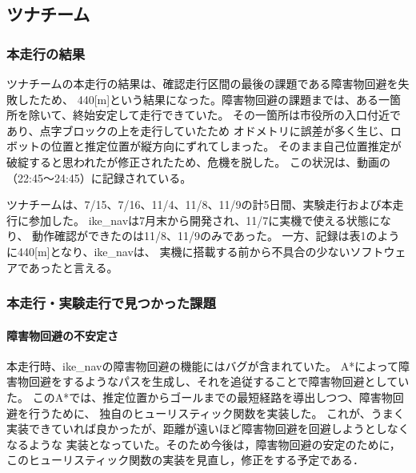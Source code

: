 \documentclass[twocolumn,9pt]{jsproceedings}
\begin{document}


\subsection{ツナチーム}
\subsubsection{本走行の結果}
ツナチームの本走行の結果は、確認走行区間の最後の課題である障害物回避を失敗したため、
440[m]という結果になった。障害物回避の課題までは、ある一箇所を除いて、終始安定して走行できていた。
その一箇所は市役所の入口付近であり、点字ブロックの上を走行していたため
オドメトリに誤差が多く生じ、ロボットの位置と推定位置が縦方向にずれてしまった。
そのまま自己位置推定が破綻すると思われたが修正されたため、危機を脱した。
この状況は、動画\cite{ike_nav_loc_youtube}の（22:45〜24:45）に記録されている。

ツナチームは、7/15、7/16、11/4、11/8、11/9の計5日間、実験走行および本走行に参加した。
ike\_navは7月末から開発され、11/7に実機で使える状態になり、
動作確認ができたのは11/8、11/9のみであった。
一方、記録は表1のように440[m]となり、ike\_navは、
実機に搭載する前から不具合の少ないソフトウェアであったと言える。

\subsubsection{本走行・実験走行で見つかった課題}
\paragraph{障害物回避の不安定さ}
本走行時、ike\_navの障害物回避の機能にはバグが含まれていた。
A*によって障害物回避をするようなパスを生成し、それを追従することで障害物回避としていた。
このA*では、推定位置からゴールまでの最短経路を導出しつつ、障害物回避を行うために、
独自のヒューリスティック関数を実装した。
これが、うまく実装できていれば良かったが、距離が遠いほど障害物回避を回避しようとしなくなるような
実装となっていた。そのため今後は，障害物回避の安定のために，このヒューリスティック関数の実装を見直し，修正をする予定である．
\end{document}
